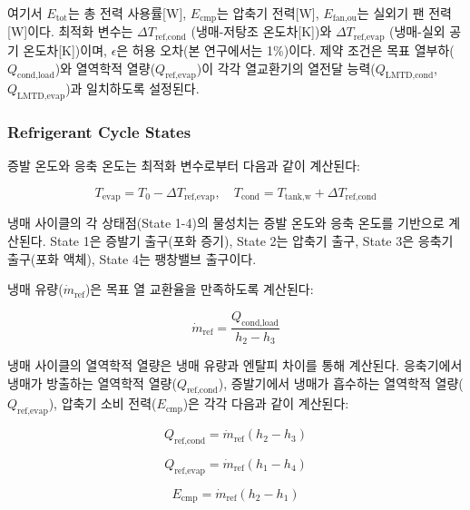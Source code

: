 \documentclass[final,5p,times,twocolumn,authoryear]{elsarticle}
\begin{document}
여기서 $E_{\text{tot}}$는 총 전력 사용률[W], $E_{\text{cmp}}$는 압축기 전력[W], $E_{\text{fan,ou}}$는 실외기 팬 전력[W]이다. 최적화 변수는 $\Delta T_{\text{ref,cond}}$ (냉매-저탕조 온도차[K])와 $\Delta T_{\text{ref,evap}}$ (냉매-실외 공기 온도차[K])이며, $\epsilon$은 허용 오차(본 연구에서는 1\%)이다. 제약 조건은 목표 열부하($Q_{\text{cond,load}}$)와 열역학적 열량($Q_{\text{ref,evap}}$)이 각각 열교환기의 열전달 능력($Q_{\text{LMTD,cond}}$, $Q_{\text{LMTD,evap}}$)과 일치하도록 설정된다.

\subsubsection{Refrigerant Cycle States}

증발 온도와 응축 온도는 최적화 변수로부터 다음과 같이 계산된다:

\begin{equation}
\label{eq:hpb_temperatures}
T_{\text{evap}} = T_0 - \Delta T_{\text{ref,evap}}, \quad T_{\text{cond}} = T_{\text{tank,w}} + \Delta T_{\text{ref,cond}}
\end{equation}

냉매 사이클의 각 상태점(State 1-4)의 물성치는 증발 온도와 응축 온도를 기반으로 계산된다. State 1은 증발기 출구(포화 증기), State 2는 압축기 출구, State 3은 응축기 출구(포화 액체), State 4는 팽창밸브 출구이다.

냉매 유량($\dot{m}_{\text{ref}}$)은 목표 열 교환율을 만족하도록 계산된다:

\begin{equation}
\label{eq:hpb_refrigerant_flow}
\dot{m}_{\text{ref}} = \frac{Q_{\text{cond,load}}}{h_2 - h_3}
\end{equation}

냉매 사이클의 열역학적 열량은 냉매 유량과 엔탈피 차이를 통해 계산된다. 응축기에서 냉매가 방출하는 열역학적 열량($Q_{\text{ref,cond}}$), 증발기에서 냉매가 흡수하는 열역학적 열량($Q_{\text{ref,evap}}$), 압축기 소비 전력($E_{\text{cmp}}$)은 각각 다음과 같이 계산된다:

\begin{equation}
\label{eq:hpb_q_ref_cond}
Q_{\text{ref,cond}} = \dot{m}_{\text{ref}} (h_2 - h_3)
\end{equation}

\begin{equation}
\label{eq:hpb_q_ref_evap}
Q_{\text{ref,evap}} = \dot{m}_{\text{ref}} (h_1 - h_4)
\end{equation}

\begin{equation}
\label{eq:hpb_e_cmp}
E_{\text{cmp}} = \dot{m}_{\text{ref}} (h_2 - h_1)
\end{equation}
\end{document}

